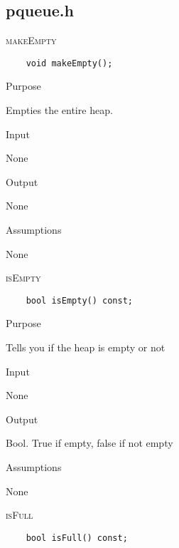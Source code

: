 \documentclass[pdftex, 12pt]{article}
\begin{document}
\subsection{pqueue.h}
\begin{description}

	\item{\textsc{makeEmpty}}
\begin{lstlisting}
	void makeEmpty();
\end{lstlisting}
		\begin{description}

			\item{Purpose}

				Empties the entire heap.

			\item{Input}

				None

			\item{Output}

				None

			\item{Assumptions}

				None

		\end{description}
	\item{\textsc{isEmpty}}
\begin{lstlisting}
	bool isEmpty() const;
\end{lstlisting}
		\begin{description}

			\item{Purpose}

				Tells you if the heap is empty or not

			\item{Input}

				None

			\item{Output}

				Bool. True if empty, false if not empty

			\item{Assumptions}

				None

		\end{description}
	\item{\textsc{isFull}}
\begin{lstlisting}
	bool isFull() const;
\end{lstlisting}
		\begin{description}


\end{description}
\end{description}
\end{document}
